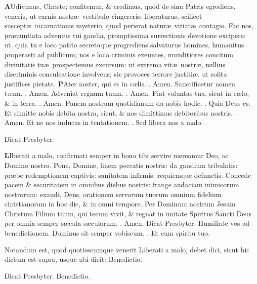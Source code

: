 \documentclass[letter,11pt]{book}
\makeatletter
\DeclareRobustCommand{\Rbar}{\vers@resp{0pt}{R}}
\newcommand{\vers@resp@sym}{\raisebox{0.2ex}{\rotatebox[origin=c]{-20}{$\m@th\rceil$}}}
\newcommand{\vers@resp}[2]{%
  {\ooalign{\hidewidth\kern#1\vers@resp@sym\hidewidth\cr#2\cr}}%
}%
\def\R{\color{Red} \Rbar . \color{black}}
\makeatother
\begin{document}
\begin{multicols}{2}
\lettrine[lines=2]{\bfseries \color{Red} A}{}Udivimus, Christe; confitemur, \& credimus, quod de sinu Patris egrediens, veneris, ut carnis nostr\ae \ vestibulo cingereris; liberaturus, scilicet suscept\ae \ incarnationis mysterio, quod perierat natur\ae \ vitiat\ae \ contagio.
Fac nos, pr\ae nuntiata adventus tui gaudia, promptissima surrectionis devotione excipere: ut, quia tu e loco patrio secretoque progrediens salvaturus homines, humanitus properasti ad publicum; nos e loco criminis exeuntes, munditiores concitum divinitatis tu\ae \ prospectemus excursum: ut extrema vit\ae \ nostr\ae , nullius discriminis conculcatione involvens; sic provoces terrore justiti\ae , ut solita justifices pietate.
\lettrine[lines=2]{\bfseries \color{Red} P}{}Ater noster, qui es in c\ae lis. \R Amen. Sanctificetur nomen tuum. \R Amen. Adveniat regnum tuum. \R Amen. Fiat voluntas tua, sicut in c\ae lo, \& in terra. \R Amen. Panem nostrum quotidianum da nobis hodie. \R Quia Deus es. Et dimitte nobis debita nostra, sicut, \& nos dimittimus debitoribus nostris. \R Amen. Et ne nos inducas in tentationem. \R Sed libera nos a malo.
\vspace{-.75em} \begin{center} \color{Red} Dicat Presbyter. \end{center} \vspace{-.75em}
\lettrine[lines=2]{\bfseries \color{Red} L}{}Iberati a malo, confirmati semper in bono tibi servire mereamur Deo, ac Domino nostro.
Pone, Domine, finem peccatis nostris: da gaudium tribulatis: pr\ae be redemptionem captivis: sanitatem infirmis: requiemque defunctis.
Concede pacem \& securitatem in omnibus diebus nostris: frange audaciam inimicorum nostrorum: exaudi, Deus, orationem servorum tuorum omnium fidelium christianorum in hoc die, \& in omni tempore.
Per Dominum nostrum Jesum Christum Filium tuum, qui tecum vivit, \& regnat in unitate Spiritus Sancti Deus per omnia semper s\ae cula s\ae culorum. \R Amen.
\newline \color{Red} Dicat Presbyter. \color{black} Humiliate vos ad benedictionem. Dominus sit semper vobiscum. \R Et cum spiritu tuo.
\par \color{Red} Notandum est, quod quotiescumque venerit \color{black} Liberati a malo, \color{Red} debet dici, sicut hic dictum est supra, usque ubi dicit: Benedictio. \color{black}
\vspace{-.75em} \begin{center} \color{Red} Dicat Presbyter. \qquad Benedictio. \end{center} \vspace{-.75em}

\end{multicols}
\end{document}

